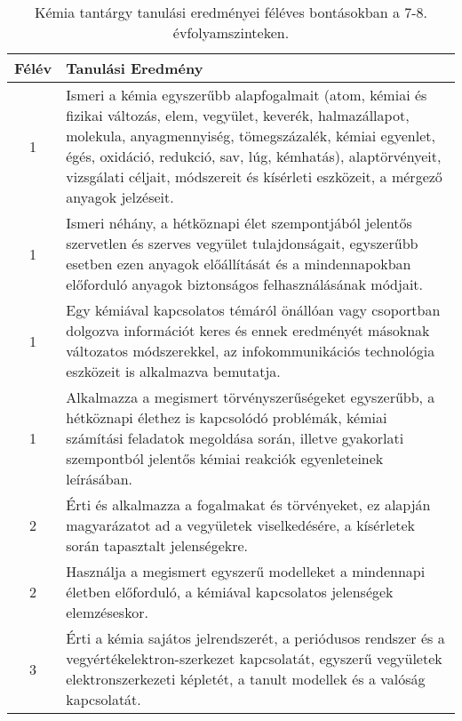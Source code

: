        
           \begin{longtable}{c | p{} }
            \caption[Kémia 7-8.]{Kémia tantárgy tanulási eredményei féléves bontásokban a 7-8. évfolyamszinteken. }  \\

            \textbf{Félév} & \textbf{Tanulási Eredmény} \\
            \hline
            \endhead
                                
                                          1 &  Ismeri a kémia egyszerűbb alapfogalmait (atom, kémiai és fizikai változás, elem, vegyület, keverék, halmazállapot, molekula, anyagmennyiség, tömegszázalék, kémiai egyenlet, égés, oxidáció, redukció, sav, lúg, kémhatás), alaptörvényeit, vizsgálati céljait, módszereit és kísérleti eszközeit, a mérgező anyagok jelzéseit. \\ \hline
                                          1 &  Ismeri néhány, a hétköznapi élet szempontjából jelentős szervetlen és szerves vegyület tulajdonságait, egyszerűbb esetben ezen anyagok előállítását és a mindennapokban előforduló anyagok biztonságos felhasználásának módjait. \\ \hline
                                          1 &  Egy kémiával kapcsolatos témáról önállóan vagy csoportban dolgozva információt keres és ennek eredményét másoknak változatos módszerekkel, az infokommunikációs technológia eszközeit is alkalmazva bemutatja. \\ \hline
                                          1 &  Alkalmazza a megismert törvényszerűségeket egyszerűbb, a hétköznapi élethez is kapcsolódó problémák, kémiai számítási feladatok megoldása során, illetve gyakorlati szempontból jelentős kémiai reakciók egyenleteinek leírásában. \\ \hline
                                      
                                
                                          2 &  Érti és alkalmazza a fogalmakat és törvényeket, ez alapján magyarázatot ad a vegyületek viselkedésére, a kísérletek során tapasztalt jelenségekre. \\ \hline
                                          2 &  Használja a megismert egyszerű modelleket a mindennapi életben előforduló, a kémiával kapcsolatos jelenségek elemzéseskor. \\ \hline
                                      
                                
                                          3 &  Érti a kémia sajátos jelrendszerét, a periódusos rendszer és a vegyértékelektron-szerkezet kapcsolatát, egyszerű vegyületek elektronszerkezeti képletét, a tanult modellek és a valóság kapcsolatát. \\ \hline
                                      

\end{longtable}
